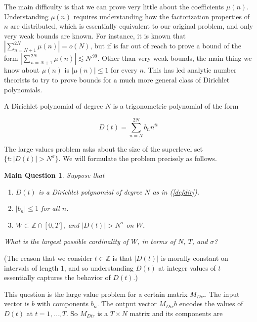 \documentclass{amsart}
\newtheorem*{mainques}{Main Question}
\newcommand{\ZZ}{\mathbb{Z}}
\begin{document}
The main difficulty is that we can prove very little about the coefficients $\mu(n)$.   Understanding $\mu(n)$ requires understanding how the factorization properties of $n$ are distributed,  which is essentially equivalent to our original problem,  and only very weak bounds are known.   For instance,  it is known that $| \sum_{n=N+1}^{2N} \mu(n) | = o(N)$, but if is far out of reach to prove a bound of the form  $| \sum_{n=N+1}^{2N} \mu(n) | \lesssim N^{.99}$.   Other than very weak bounds,  the main thing we know about $\mu(n)$ is $|\mu(n)| \le 1$ for every $n$.   This has led analytic number theorists to try to prove bounds for a much more general class of Dirichlet polynomials.  

A Dirichlet polynomial of degree $N$ is a trigonometric polynomial of the form

\begin{equation} \label{defdir} D(t) = \sum_{n=N}^{2N} b_n n^{it} \end{equation}

\noindent The large values problem asks about the size of the superlevel set $\{ t: |D(t)| > N^\sigma \}$.  We will formulate the problem precisely as follows.

\begin{mainques} Suppose that

\begin{enumerate}

\item $D(t)$ is a Dirichlet polynomial of degree $N$ as in (\ref{defdir}).

\item $|b_n| \le 1$ for all $n$.

\item $W \subset \ZZ \cap [0,T]$, and $|D(t)| > N^\sigma$ on $W$.  

\end{enumerate}

What is the largest possible cardinality of $W$, in terms of $N$, $T$, and $\sigma$?
\end{mainques}

(The reason that we consider $t \in \ZZ$ is that $|D(t)|$ is morally constant on intervals of length 1, and so understanding $D(t)$ at integer values of $t$ essentially captures the behavior of $D(t)$.)

This question is the large value problem for a certain matrix $M_{Dir}$.   The input vector is $b$ with components $b_n$.   The output vector $M_{Dir} b$ encodes the values of $D(t)$ at $t = 1, ..., T$.   So $M_{Dir}$ is a $T \times N$ matrix and its components are 
\end{document}
